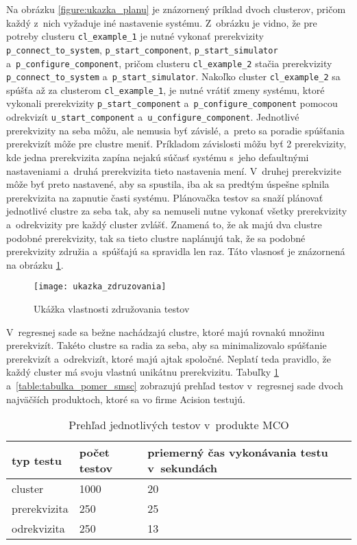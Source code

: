 Na obrázku \ref{figure:ukazka_planu} je znázornený príklad dvoch clusterov, pričom každý z~nich vyžaduje iné nastavenie systému. 
Z~obrázku je vidno, že pre potreby clusteru \texttt {cl\_example\_1} je nutné vykonať prerekvizity \texttt{p\_connect\_to\_system}, 
\texttt{p\_start\_component}, \texttt{p\_start\_simulator} a~\texttt{p\_configure\_component},
pričom clusteru \texttt{cl\_example\_2} stačia prerekvizity \texttt{p\_connect\_to\_system} a~\texttt{p\_start\_simulator}.
Nakoľko cluster \texttt{cl\_example\_2} sa spúšťa až za clusterom \texttt{cl\_example\_1}, je nutné vrátiť zmeny systému, ktoré vykonali prerekvizity 
\texttt{p\_start\_component} a~\texttt{p\_configure\_component} pomocou odrekvizít \texttt{u\_start\_component} a~\texttt{u\_configure\_component}.
Jednotlivé prerekvizity na seba môžu, ale nemusia byť závislé, a~preto sa poradie spúšťania prerekvizít môže pre clustre meniť.
Príkladom závislosti môžu byť 2 prerekvizity, kde jedna prerekvizita zapína nejakú súčasť systému s~jeho defaultnými nastaveniami a~druhá prerekvizita 
tieto nastavenia mení. V~druhej prerekvizite môže byť preto nastavené, aby sa spustila, iba ak sa predtým úspešne splnila prerekvizita na zapnutie 
časti systému.
Plánovačka testov sa snaží plánovať jednotlivé clustre za seba tak, aby sa nemuseli nutne vykonať všetky prerekvizity a~odrekvizity pre každý cluster zvlášť.
Znamená to, že ak majú dva clustre podobné prerekvizity, tak sa tieto clustre naplánujú tak, že sa podobné prerekvizity združia a~spúšťajú sa spravidla len raz. 
Táto vlasnosť je znázornená na obrázku \ref{figure:ukazka_zdruzovania}. 
\begin{figure}[h]
    \texttt{[image: ukazka\_zdruzovania]}
    \caption{Ukážka vlastnosti združovania testov}
    \label{figure:ukazka_zdruzovania}
\end{figure}

V~regresnej sade sa bežne nachádzajú clustre, ktoré majú rovnakú množinu prerekvizít. Takéto clustre sa radia za seba, aby sa minimalizovalo
spúšťanie prerekvizít a~odrekvizít, ktoré majú ajtak spoločné. Neplatí teda pravidlo, že každý cluster má svoju vlastnú unikátnu prerekvizitu.
Tabuľky \ref{table:tabulka_pomer_mco} a~\ref{table:tabulka_pomer_smsc} zobrazujú prehľad testov v~regresnej sade dvoch najväčších produktoch,
ktoré sa vo firme Acision testujú.

\begin{table}
  \begin{center}
    \begin{tabular}{| l | l | l |}
    \hline
    typ testu & počet testov & priemerný čas vykonávania testu v~sekundách\\ \hline
    cluster & 1000 & 20 \\ \hline
    prerekvizita & 250 & 25 \\ \hline
    odrekvizita & 250 & 13 \\
    \hline
    \end{tabular}
    \label{table:tabulka_pomer_mco}
    \caption{Prehľad jednotlivých testov v~produkte MCO}
  \end{center}
\end{table}

